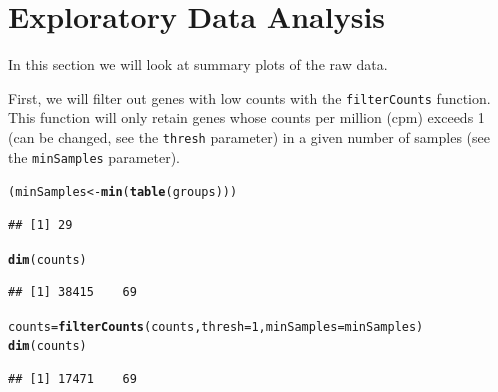 \documentclass{article}\usepackage[]{graphicx}\usepackage[usenames,dvipsnames]{color}
\makeatletter
\newcommand{\hlnum}[1]{\textcolor[rgb]{0.686,0.059,0.569}{#1}}%
\newcommand{\hlstd}[1]{\textcolor[rgb]{0.345,0.345,0.345}{#1}}%
\newcommand{\hlkwb}[1]{\textcolor[rgb]{0.69,0.353,0.396}{#1}}%
\newcommand{\hlkwc}[1]{\textcolor[rgb]{0.333,0.667,0.333}{#1}}%
\newcommand{\hlkwd}[1]{\textcolor[rgb]{0.737,0.353,0.396}{\textbf{#1}}}%
\newenvironment{kframe}{%
 \def\at@end@of@kframe{}%
 \ifinner\ifhmode%
  \def\at@end@of@kframe{\end{minipage}}%
  \begin{minipage}{\columnwidth}%
 \fi\fi%
 \def\FrameCommand##1{\hskip\@totalleftmargin \hskip-\fboxsep
 \colorbox{shadecolor}{##1}\hskip-\fboxsep
     \hskip-\linewidth \hskip-\@totalleftmargin \hskip\columnwidth}%
 \MakeFramed {\advance\hsize-\width
   \@totalleftmargin\z@ \linewidth\hsize
   \@setminipage}}%
 {\par\unskip\endMakeFramed%
 \at@end@of@kframe}
\newenvironment{knitrout}{}{} %
\makeatother
\begin{document}
\section{Exploratory Data Analysis}

In this section we will look at summary plots
of the raw data.

% 
%  
%  

First, we will filter out genes with low counts with the \texttt{filterCounts}
function. This function will only retain genes whose counts per million (cpm)
exceeds 1 (can be changed, see the \texttt{thresh} parameter) in a given
number of samples (see the \texttt{minSamples} parameter).

\begin{knitrout}
\color{fgcolor}\begin{kframe}
\begin{alltt}
\hlstd{(minSamples} \hlkwb{<-} \hlkwd{min}\hlstd{(}\hlkwd{table}\hlstd{(groups)))}
\end{alltt}
\begin{verbatim}
## [1] 29
\end{verbatim}
\begin{alltt}
\hlkwd{dim}\hlstd{(counts)}
\end{alltt}
\begin{verbatim}
## [1] 38415    69
\end{verbatim}
\begin{alltt}
\hlstd{counts} \hlkwb{=} \hlkwd{filterCounts}\hlstd{(counts,} \hlkwc{thresh}\hlstd{=}\hlnum{1}\hlstd{,} \hlkwc{minSamples}\hlstd{=minSamples)}
\hlkwd{dim}\hlstd{(counts)}
\end{alltt}
\begin{verbatim}
## [1] 17471    69
\end{verbatim}
\end{kframe}
\end{knitrout}
\end{document}
